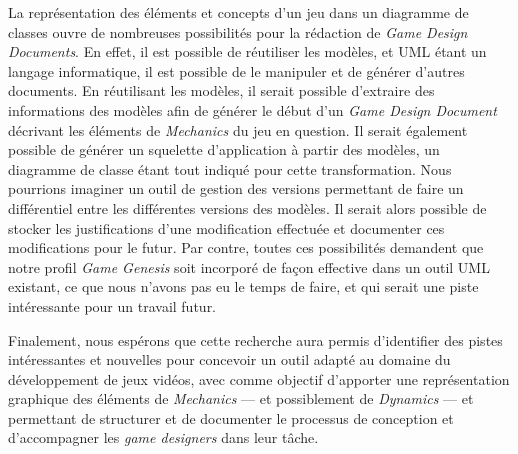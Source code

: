 \begin{conclusion}
La représentation des éléments et concepts d'un jeu dans un diagramme de classes ouvre de nombreuses possibilités pour la rédaction de \emph{Game Design Documents}.
En effet, il est possible de réutiliser les modèles, et UML étant un langage informatique, il est possible de le manipuler et de générer d'autres documents.
En réutilisant les modèles, il serait possible d'extraire des informations des modèles afin de générer le début d'un \emph{Game Design Document} décrivant les éléments de \emph{Mechanics} du jeu en question.
Il serait également possible de générer un squelette d'application à partir des modèles, un diagramme de classe étant tout indiqué pour cette transformation.
Nous pourrions imaginer un outil de gestion des versions permettant de faire un différentiel entre les différentes versions des modèles.
Il serait alors possible de stocker les justifications d'une modification effectuée et documenter ces modifications pour le futur.
%
Par contre, toutes ces possibilités demandent que notre profil
\emph{Game Genesis} soit incorporé de façon effective dans un outil
UML existant, ce que nous n'avons pas eu le temps de faire, et qui
serait une piste intéressante pour un travail futur.





Finalement, nous espérons que cette recherche aura permis d'identifier des pistes intéressantes et nouvelles pour concevoir un outil adapté au domaine du développement de jeux vidéos, avec comme objectif d'apporter une représentation graphique des éléments de \emph{Mechanics} --- et possiblement de \emph{Dynamics} --- et  permettant de structurer et de documenter le processus de conception et d'accompagner les \emph{game designers} dans leur tâche.



\end{conclusion}
